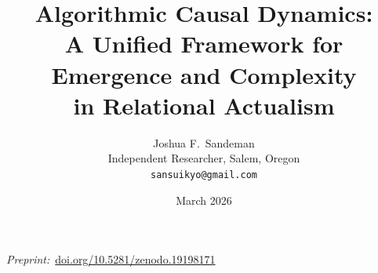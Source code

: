 \documentclass[11pt,a4paper]{article}
\theoremstyle{remark}
\begin{document}
\title{Algorithmic Causal Dynamics:\\
A Unified Framework for Emergence and Complexity\\
in Relational Actualism}

\author{Joshua F.\ Sandeman\\
\small Independent Researcher, Salem, Oregon\\
\small \texttt{sansuikyo@gmail.com}}
\date{March 2026}
\maketitle
\begin{center}
  {\small\textit{Preprint:}~\href{https://doi.org/10.5281/zenodo.19198171}
    {doi.org/10.5281/zenodo.19198171}\par}
\end{center}
\end{document}
